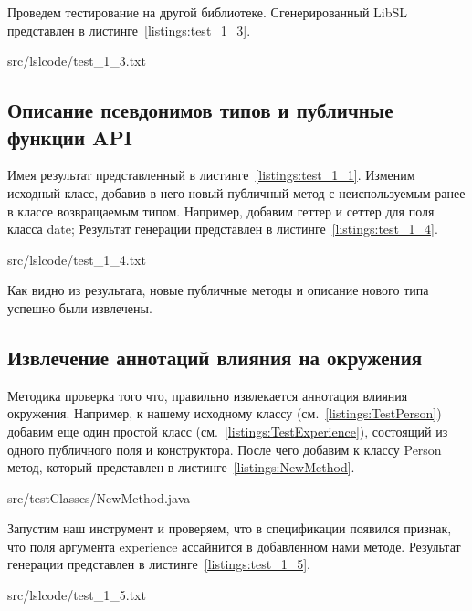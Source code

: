 Проведем тестирование на другой библиотеке. Сгенерированный LibSL представлен в листинге~\ref{listings:test_1_3}.

{src/lslcode/test_1_3.txt}

\subsection{Описание псевдонимов типов и публичные функции API}

Имея результат представленный в листинге~\ref{listings:test_1_1}.
Изменим исходный класс, добавив в него новый публичный метод с неиспользуемым ранее в классе возвращаемым типом.
Например, добавим геттер и сеттер для поля класса date;
Результат генерации представлен в листинге~\ref{listings:test_1_4}.

{src/lslcode/test_1_4.txt}

Как видно из результата, новые публичные методы и описание нового типа успешно были извлечены.

\subsection{Извлечение аннотаций влияния на окружения}

Методика проверка того что, правильно извлекается аннотация влияния окружения. Например, к нашему исходному классу (см.~\ref{listings:TestPerson}) добавим еще один простой класс (см.~\ref{listings:TestExperience}), состоящий из одного публичного поля и конструктора.
После чего добавим к классу Person метод, который представлен в листинге~\ref{listings:NewMethod}.

{src/testClasses/NewMethod.java}

Запустим наш инструмент и проверяем, что в спецификации появился признак, что поля аргумента experience ассайнится в добавленном нами методе.
Результат генерации представлен в листинге~\ref{listings:test_1_5}.

{src/lslcode/test_1_5.txt}

